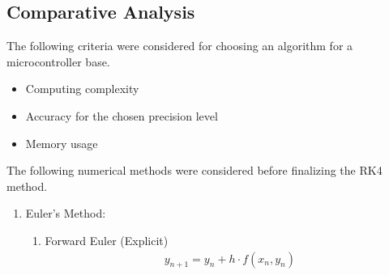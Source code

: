 \documentclass[conference]{IEEEtran}
\begin{document}
\subsection{Comparative Analysis}
\label{appendix:comparison}
The following criteria were considered for choosing an algorithm for a microcontroller base.
\begin{itemize}
  \item Computing complexity
  \item Accuracy for the chosen precision level
  \item Memory usage
\end{itemize}
The following numerical methods were considered before finalizing the RK4 method.
\begin{enumerate}
	\item {Euler's Method:}
\begin{enumerate}
	\item {Forward Euler (Explicit)}
\begin{align}
y_{n+1} = y_n + h\cdot f(x_n, y_n)
\end{align}


\end{enumerate}
\end{enumerate}
\end{document}
